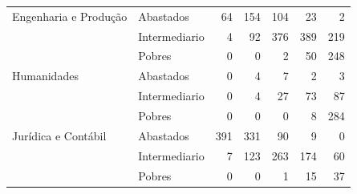 \documentclass[10pt,a4paper,oneside]{article}
\begin{document}
\begin{table}[ht]
\begin{tabular}{ll rrrrr}
  Engenharia e Produção   & Abastados               &                 64 &          154 &         104 &         23 &                2 \\ 
                          & Intermediario           &                  4 &           92 &         376 &        389 &              219 \\ 
                          & Pobres                  &                  0 &            0 &           2 &         50 &              248 \\ 
  Humanidades             & Abastados               &                  0 &            4 &           7 &          2 &                3 \\ 
                          & Intermediario           &                  0 &            4 &          27 &         73 &               87 \\ 
                          & Pobres                  &                  0 &            0 &           0 &          8 &              284 \\ 
  Jurídica e Contábil     & Abastados               &                391 &          331 &          90 &          9 &                0 \\ 
                          & Intermediario           &                  7 &          123 &         263 &        174 &               60 \\ 
                          & Pobres                  &                  0 &            0 &           1 &         15 &               37 \\ 
   \bottomrule
\end{tabular}
\end{table}
\end{document}
